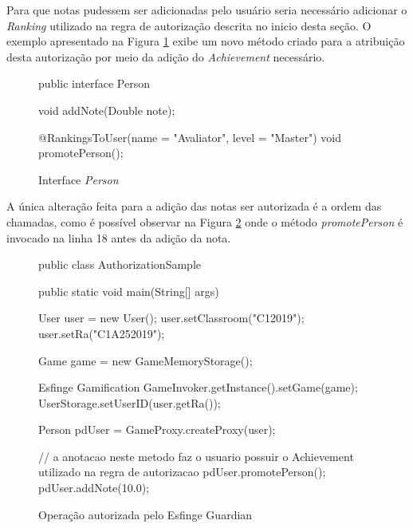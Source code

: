 \par Para que notas pudessem ser adicionadas pelo usuário seria necessário adicionar o \textit{Ranking} utilizado na regra de autorização descrita no inicio desta seção. O exemplo apresentado na Figura \ref{fig:autorizacao-ok} exibe um novo método criado para a atribuição desta autorização por meio da adição do \textit{Achievement} necessário.


\begin{figure}[H]
    \centering
    \caption{Interface \textit{Person}}
    \begin{java}
public interface Person {

	void addNote(Double note);

	@RankingsToUser(name = "Avaliator", level = "Master")
	void promotePerson();
}
    \end{java}
    \label{fig:autorizacao-ok}
\end{figure}

\par A única alteração feita para a adição das notas ser autorizada é a ordem das chamadas, como é possível observar na Figura \ref{fig:hellow-world-gamification-autorizada} onde o método \textit{promotePerson} é invocado na linha 18 antes da adição da nota.

\begin{figure}[H]
    \centering
    \caption{Operação autorizada pelo Esfinge Guardian}
    \begin{java}
public class AuthorizationSample {

	public static void main(String[] args) {

		User user = new User();
		user.setClassroom("C12019");
		user.setRa("C1A252019");
		
		Game game = new GameMemoryStorage();

	    Esfinge Gamification
		GameInvoker.getInstance().setGame(game);
		UserStorage.setUserID(user.getRa());

		Person pdUser = GameProxy.createProxy(user);
		
		// a anotacao neste metodo faz o usuario possuir o Achievement utilizado na regra de autorizacao
		pdUser.promotePerson();
		pdUser.addNote(10.0);

	}
}
    \end{java}
    \label{fig:hellow-world-gamification-autorizada}
\end{figure}